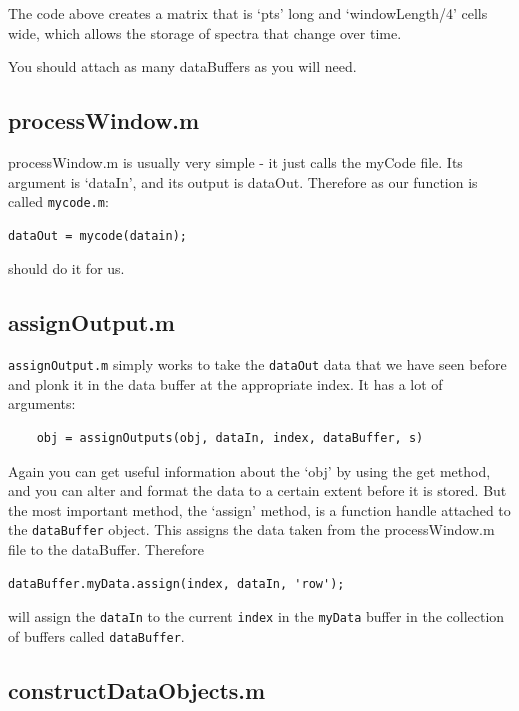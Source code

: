 \documentclass{article}
\begin{document}
The code above creates a matrix that is `pts' long and `windowLength/4' cells wide, which allows the storage of spectra that change over time.

You should attach as many dataBuffers as you will need.

\subsection{processWindow.m}

processWindow.m is usually very simple - it just calls the myCode file. Its argument is `dataIn', and its output is dataOut. Therefore as our function is called \texttt{mycode.m}:

\begin{verbatim}
dataOut = mycode(datain);
\end{verbatim}

should do it for us. 

\subsection{assignOutput.m}

\texttt{assignOutput.m} simply works to take the \texttt{dataOut} data that we have seen before and plonk it in the data buffer at the appropriate index. It has a lot of arguments:

\begin{verbatim}
	obj = assignOutputs(obj, dataIn, index, dataBuffer, s)
\end{verbatim}

Again you can get useful information about the `obj' by using the get method, and you can alter and format the data to a certain extent before it is stored.  But the most important method, the `assign' method, is a function handle attached to the \texttt{dataBuffer} object. This assigns the data taken from the processWindow.m file to the dataBuffer. Therefore

\begin{verbatim}
dataBuffer.myData.assign(index, dataIn, 'row');
 \end{verbatim}

will assign the \texttt{dataIn} to the current \texttt{index} in the \texttt{myData} buffer in the collection of buffers called \texttt{dataBuffer}.

\subsection{constructDataObjects.m}
\end{document}
